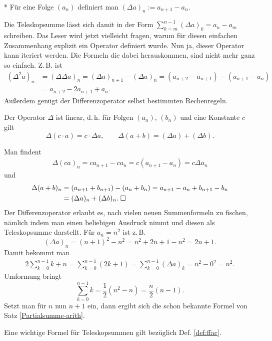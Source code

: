 \begin{Definition}[Differenzoperator]\mbox{}\\*
Für eine Folge $(a_n)$ definiert man
$(\Delta a)_n := a_{n+1}-a_n.$
\end{Definition}
Die Teleskopsumme lässt sich damit in der Form
$\sum_{k=m}^{n-1}(\Delta a)_k = a_n-a_m$
schreiben. Das Leser wird jetzt vielleicht fragen, warum für diesen
einfachen Zusammenhang explizit ein Operator definiert wurde.
Nun ja, dieser Operator kann iteriert werden. Die Formeln die
dabei herauskommen, sind nicht mehr ganz so einfach. Z.\,B. ist
\begin{align*}
(\Delta^2 a)_n &= (\Delta \Delta a)_n
= (\Delta a)_{n+1}-(\Delta a)_n
= (a_{n+2}-a_{n+1}) - (a_{n+1}-a_n)\\
&= a_{n+2}-2a_{n+1}+a_n.
\end{align*}
Außerdem genügt der Differenzoperator selbst bestimmten Rechenregeln.
\begin{Satz}
Der Operator $\Delta$ ist linear, d.\,h. für
Folgen $(a_n)$, $(b_n)$ und eine Konstante $c$ gilt%
\[\Delta(c\cdot a) = c\cdot\Delta a,\qquad
\Delta(a+b) = (\Delta a)+(\Delta b).\]
\end{Satz}
 Man findent
\begin{gather*}
\Delta (ca)_n = ca_{n+1}-ca_n
= c(a_{n+1}-a_n) = c\Delta a_n
\end{gather*}
und
\begin{align*}
\Delta (a+b)_n &= (a_{n+1}+b_{n+1})-(a_n+b_n)
= a_{n+1}-a_n + b_{n+1}-b_n\\
&= (\Delta a)_n + (\Delta b)_n.\;\Box
\end{align*}
Der Differenzoperator erlaubt es, nach vielen neuen Summenformeln
zu fischen, nämlich indem man einen beliebigen Ausdruck nimmt und
diesen als Teleskopsumme darstellt. Für $a_n=n^2$ ist z.\,B.
\[(\Delta a)_n = (n+1)^2-n^2 = n^2+2n+1-n^2 = 2n+1.\]
Damit bekommt man
\begin{gather*}
2\sum_{k=0}^{n-1} k + n = \sum_{k=0}^{n-1} (2k+1) = 
\sum_{k=0}^{n-1} (\Delta a)_k
= n^2-0^2 = n^2.
\end{gather*}
Umformung bringt
\[\sum_{k=0}^{n-1} k = \frac{1}{2}(n^2-n) = \frac{n}{2}(n-1).\]
Setzt man für $n$ nun $n+1$ ein, dann ergibt sich die schon
bekannte Formel von Satz \ref{Partialsumme-arith}.

Eine wichtige Formel für Teleskopsummen gilt
bezüglich Def. \ref{def:ffac}.

